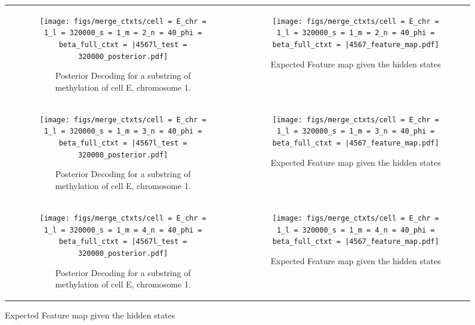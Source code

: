\documentclass{article}
\begin{document}
\begin{figure}[H]
    \begin{tabular}{cc}
      \begin{subfigure}[t]{0.4\textwidth}
        \texttt{[image: figs/merge\_ctxts/cell = E\_chr = 1\_l = 320000\_s = 1\_m = 2\_n = 40\_phi = beta\_full\_ctxt = |4567l\_test = 320000\_posterior.pdf]}
        \caption{Posterior Decoding for a substring of methylation of cell E, chromosome 1.}
      \end{subfigure}
      &
      \begin{subfigure}[t]{0.4\textwidth}
        \texttt{[image: figs/merge\_ctxts/cell = E\_chr = 1\_l = 320000\_s = 1\_m = 2\_n = 40\_phi = beta\_full\_ctxt = |4567\_feature\_map.pdf]}
        \caption{Expected Feature map given the hidden states}
      \end{subfigure}
      \\
      \begin{subfigure}[t]{0.4\textwidth}
        \texttt{[image: figs/merge\_ctxts/cell = E\_chr = 1\_l = 320000\_s = 1\_m = 3\_n = 40\_phi = beta\_full\_ctxt = |4567l\_test = 320000\_posterior.pdf]}
        \caption{Posterior Decoding for a substring of methylation of cell E, chromosome 1.}
      \end{subfigure}
      &
      \begin{subfigure}[t]{0.4\textwidth}
        \texttt{[image: figs/merge\_ctxts/cell = E\_chr = 1\_l = 320000\_s = 1\_m = 3\_n = 40\_phi = beta\_full\_ctxt = |4567\_feature\_map.pdf]}
        \caption{Expected Feature map given the hidden states}
      \end{subfigure}
      \\
      \begin{subfigure}[t]{0.4\textwidth}
        \texttt{[image: figs/merge\_ctxts/cell = E\_chr = 1\_l = 320000\_s = 1\_m = 4\_n = 40\_phi = beta\_full\_ctxt = |4567l\_test = 320000\_posterior.pdf]}
        \caption{Posterior Decoding for a substring of methylation of cell E, chromosome 1.}
      \end{subfigure}
      &
      \begin{subfigure}[t]{0.4\textwidth}
        \texttt{[image: figs/merge\_ctxts/cell = E\_chr = 1\_l = 320000\_s = 1\_m = 4\_n = 40\_phi = beta\_full\_ctxt = |4567\_feature\_map.pdf]}
        \caption{Expected Feature map given the hidden states}
      \end{subfigure}
    \end{tabular}
  \end{figure}
\end{document}
